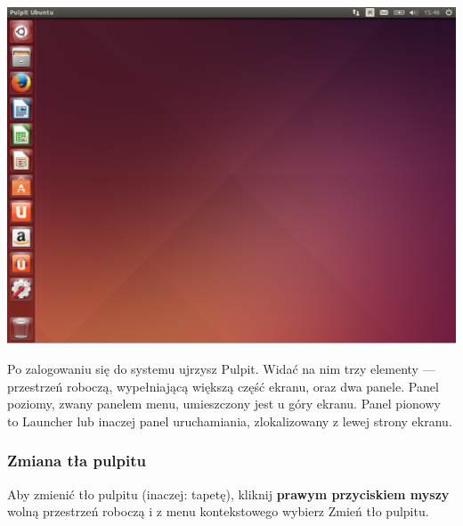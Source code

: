 \begin{center}
	\includegraphics[width=\linewidth]{images/unity_desktop.png}
\end{center}

Po zalogowaniu się do systemu ujrzysz Pulpit. Widać na nim trzy elementy --- przestrzeń roboczą, wypełniającą większą część ekranu, oraz dwa panele. Panel poziomy, zwany \textcolor{ubuntu_orange}{panelem menu}, umieszczony jest u góry ekranu. Panel pionowy to \textcolor{ubuntu_orange}{Launcher} lub inaczej panel uruchamiania, zlokalizowany z lewej strony ekranu.

\subsubsection{Zmiana tła pulpitu}
Aby zmienić tło pulpitu (inaczej: tapetę), kliknij \textbf{prawym przyciskiem myszy} wolną przestrzeń roboczą i z menu kontekstowego wybierz \textcolor{ubuntu_orange}{Zmień tło pulpitu}.

